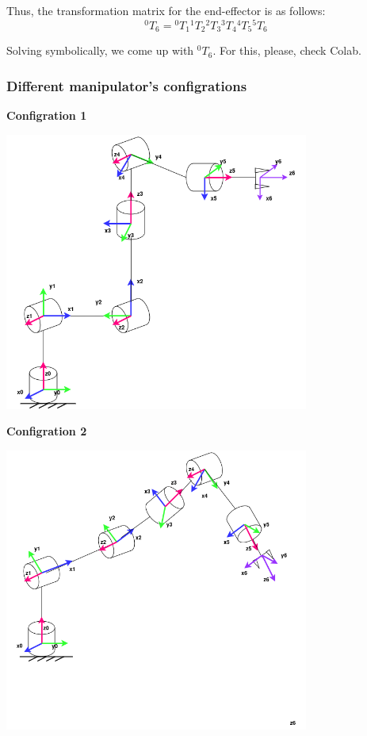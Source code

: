 \documentclass{article}
\begin{document}
Thus, the transformation matrix for the end-effector is as follows:
\[{}^0T_6 = {}^0T_1 {}^1T_2 {}^2T_3 {}^3T_4 {}^4T_5 {}^5T_6\]



Solving symbolically, we come up with ${}^0T_6$. For this, please, check Colab.\\





\newpage

\subsubsection{Different manipulator's configrations}

\textbf{Configration 1}

\begin{center}
    \includegraphics*[width=0.75\textwidth]{images/config1.png}
\end{center}

\textbf{Configration 2}

\begin{center}
    \includegraphics*[width=0.75\textwidth]{images/config2.png}
\end{center}
\end{document}

